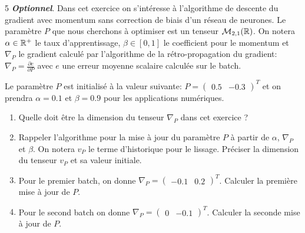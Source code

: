 \documentclass[solutions]{../cc}
\begin{document}
	
	\begin{exopoints}{5}
		\textit{\textbf{Optionnel}}. Dans cet exercice on s'intéresse à l'algorithme de descente du gradient avec momentum sans correction de biais d'un réseau de neurones. Le paramètre $P$ que nous cherchons à optimiser est un tenseur $\mathcal{M}_{2, 1}(\mathbb{R})$. On notera $\alpha \in \mathbb{R}^+$ le taux d'apprentissage, $\beta \in [0, 1]$ le coefficient pour le momentum et $\nabla_P$ le gradient calculé par l'algorithme de la rétro-propagation du gradient: $\nabla_P = \frac{\partial{e}}{\partial{P}}$ avec $e$ une erreur moyenne scalaire calculée sur le batch.
		
		Le paramètre $P$ est initialisé à la valeur suivante: $P = \begin{pmatrix}0.5 & -0.3\end{pmatrix}^T$ et on prendra $\alpha = 0.1$ et $\beta = 0.9$ pour les applications numériques.
		
		\begin{enumerate}
			\item Quelle doit être la dimension du tenseur $\nabla_P$ dans cet exercice ?
			\item Rappeler l'algorithme pour la mise à jour du paramètre $P$ à partir de $\alpha$, $\nabla_P$ et $\beta$. On notera $v_P$ le terme d'historique pour le lissage. Préciser la dimension du tenseur $v_P$ et sa valeur initiale.
			\item Pour le premier batch, on donne $\nabla_P = \begin{pmatrix}-0.1 & 0.2\end{pmatrix}^T$. Calculer la première mise à jour de $P$.
			\item Pour le second batch on donne $\nabla_P = \begin{pmatrix}0 & -0.1\end{pmatrix}^T$. Calculer la seconde mise à jour de $P$.
		\end{enumerate}
		
	\end{exopoints}
\end{document}
